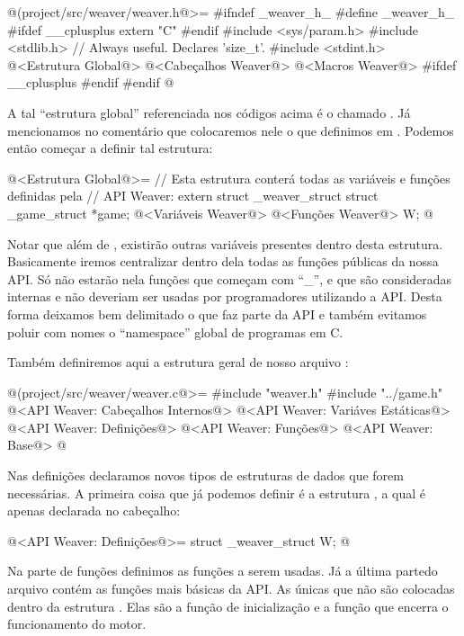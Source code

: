 \iniciocodigo
@(project/src/weaver/weaver.h@>=
#ifndef _weaver_h_
#define _weaver_h_
#ifdef __cplusplus
  extern "C" {
#endif
#include <sys/param.h>
#include <stdlib.h> // Always useful. Declares 'size_t'.
#include <stdint.h>
@<Estrutura Global@>
@<Cabeçalhos Weaver@>
@<Macros Weaver@>
#ifdef __cplusplus
  }
#endif
#endif
@
\fimcodigo


A tal ``estrutura global'' referenciada nos códigos acima é
o  chamado . Já mencionamos no
comentário que colocaremos nele
o  que definimos
em . Podemos então começar a definir tal estrutura:

\iniciocodigo
@<Estrutura Global@>=
// Esta estrutura conterá todas as variáveis e funções definidas pela
// API Weaver:
extern struct _weaver_struct{
  struct _game_struct *game;
  @<Variáveis Weaver@>
  @<Funções Weaver@>
} W;
@
\fimcodigo

Notar que além de , existirão outras variáveis
presentes dentro desta estrutura. Basicamente iremos centralizar
dentro dela todas as funções públicas da nossa API. Só não estarão
nela funções que começam com ``\_'', e que são consideradas internas e
não deveriam ser usadas por programadores utilizando a API. Desta
forma deixamos bem delimitado o que faz parte da API e também evitamos
poluir com nomes o ``namespace'' global de programas em C.

Também definiremos aqui a estrutura geral de nosso
arquivo :

\iniciocodigo
@(project/src/weaver/weaver.c@>=
#include "weaver.h"
#include "../game.h"
@<API Weaver: Cabeçalhos Internos@>
@<API Weaver: Variáves Estáticas@>
@<API Weaver: Definições@>
@<API Weaver: Funções@>
@<API Weaver: Base@>
@
\fimcodigo

Nas definições declaramos novos tipos de estruturas de dados que forem
necessárias. A primeira coisa que já podemos definir é a
estrutura , a qual é apenas declarada no cabeçalho:

\iniciocodigo
@<API Weaver: Definições@>=
struct _weaver_struct W;
@
\fimcodigo

Na parte de funções definimos as funções a serem usadas. Já a última
partedo arquivo contém as funções mais básicas da API. As únicas que
não são colocadas dentro da estrutura . Elas são a
função de inicialização e a função que encerra o funcionamento do
motor.

